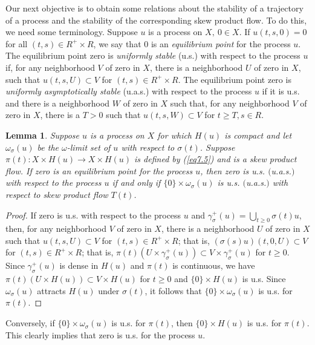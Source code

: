 \documentclass{surv-l}
\theoremstyle{plain}
\newtheorem{lemma}[theorem]{Lemma}
\theoremstyle{definition}
\numberwithin{equation}{section}
\numberwithin{figure}{chapter}
\begin{document}
Our next objective is to obtain some relations about the stability of a trajectory of a process and the stability of the corresponding skew product flow. To do this, we need some terminology. Suppose $u$ is a process on $X,\ 0\in X$. If $u(t, s, 0)=0$ for all $(t, s)\in R^{+}\times R$, we say that $0$ is an \emph{equilibrium point} for the process $u$. The equilibrium point zero is \emph{uniformly stable} (u.s.) with respect to the process $u$ if, for any neighborhood $V$ of zero in $X$, there is a neighborhood $U$ of zero in $X$, such that $u(t,s,U)\subset V$ for $(t,s)\in R^{+}\times R$. The equilibrium point zero is \emph{uniformly asymptotically stable} (u.a.s.) with respect to the process $u$ if it is u.s. and there is a neighborhood $W$ of zero in $X$ such that, for any neighborhood $V$ of zero in $X$, there is a $T>0$ such that $u(t,s,W)\subset V$ for $t\geq T,s\in R$.

\begin{lemma}\label{lem3.7.3} Suppose $u$ is a process on $X$ for which $H(u)$ is compact and let $\omega_{\sigma}(u)$ be the $\omega$-limit set of $u$ with respect to $\sigma(t)$. Suppose $\pi(t)\!:X\times H(u)\rightarrow X\times H(u)$ is defined by \emph{(\ref{eq7.5})} and is a skew product flow. If zero is an equilibrium point for the process $u$, then zero is u.s. $($u.a.s.$)$ with respect to the process $u$ if and only if $\{0\}\times\omega_{\sigma}(u)$ is u.s. $($u.a.s.$)$ with respect to skew product flow $T(t)$.
\end{lemma}

\begin{proof}If zero is u.s. with respect to the process $u$ and $\gamma_{\sigma}^{+}(u)=\bigcup_{t\geq0}\sigma(t)u$, then, for any neighborhood $V$ of zero in $X$, there is a neighborhood $U$ of zero in $X$ such that $u(t,s,U)\subset V$ for $(t,s) \in R^{+}\times R$; that is, $(\sigma(s)u)(t,0, U)\subset V$ for $(t,s)\in R^{+}\times R$; that is, $\pi(t)(U\times\gamma_{\sigma}^{+}(u))\subset V\times\gamma_{\sigma}^{+}(u)$ for $t\geq 0$. Since $\gamma_{\sigma}^{+}(u)$ is dense in $H(u)$ and $\pi(t)$ is continuous, we have $\pi(t)(U\times H(u))\subset V\times H(u)$ for $t\geq 0$ and $\{0\}\times H(u)$ is u.s. Since $\omega_{\sigma}(u)$ attracts $H(u)$ under $\sigma(t)$, it follows that $\{0\}\times\omega_{\sigma}(u)$ is u.s. for $\pi(t)$.
\end{proof}

Conversely, if $\{0\}\times\omega_{\sigma}(u)$ is u.s. for $\pi(t)$, then $\{0\}\times H(u)$ is u.s. for $\pi(t)$. This clearly implies that zero is u.s. for the process $u$.
\end{document}

